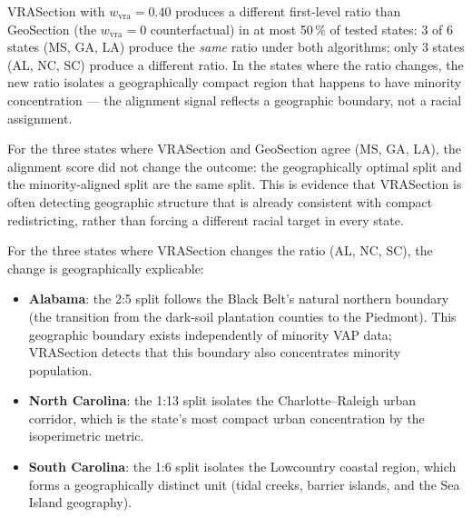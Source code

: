 \begin{proposition}
\label{prop:counterfactual}
VRASection with $w_\text{vra} = 0.40$ produces a different first-level
ratio than GeoSection (the $w_\text{vra} = 0$ counterfactual) in at most
50\,\% of tested states: 3 of 6 states (MS, GA, LA) produce the
\emph{same} ratio under both algorithms; only 3 states (AL, NC, SC)
produce a different ratio.
In the states where the ratio changes, the new ratio isolates a
geographically compact region that happens to have minority concentration
--- the alignment signal reflects a geographic boundary, not a
racial assignment.
\end{proposition}

\noindent
For the three states where VRASection and GeoSection agree (MS, GA, LA),
the alignment score did not change the outcome: the geographically optimal
split and the minority-aligned split are the same split.
This is evidence that VRASection is often detecting geographic structure that
is already consistent with compact redistricting, rather than forcing a
different racial target in every state.

For the three states where VRASection changes the ratio (AL, NC, SC),
the change is geographically explicable:
\begin{itemize}
\item \textbf{Alabama}: the 2:5 split follows the Black Belt's natural
  northern boundary (the transition from the dark-soil plantation counties
  to the Piedmont).
  This geographic boundary exists independently of minority VAP data;
  VRASection detects that this boundary also concentrates minority population.
\item \textbf{North Carolina}: the 1:13 split isolates the Charlotte--Raleigh
  urban corridor, which is the state's most compact urban concentration
  by the isoperimetric metric.
\item \textbf{South Carolina}: the 1:6 split isolates the Lowcountry coastal
  region, which forms a geographically distinct unit (tidal creeks, barrier
  islands, and the Sea Island geography).
\end{itemize}

